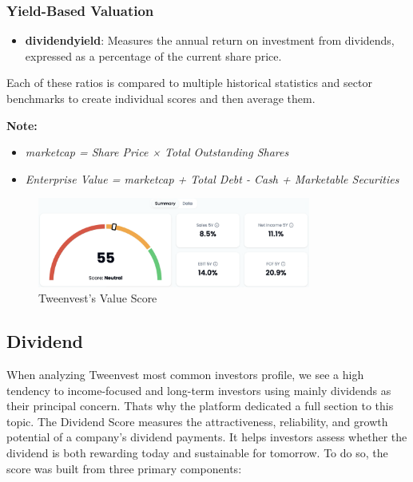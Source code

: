 \documentclass[11pt,english,a4paper,hidelinks]{book}
\begin{document}
\subsubsection{Yield-Based Valuation}
\begin{itemize}
    \item \textbf{\acrshort{dividendyield}}: Measures the annual return on investment from dividends, expressed as a percentage of the current share price.
\end{itemize}

\vspace{0.5cm}
\noindent Each of these ratios is compared to multiple historical statistics and sector benchmarks to create individual scores and then average them.

\vspace{0.5cm}
\noindent \textbf{Note:}
\begin{itemize}
    \item \textit{\acrshort{marketcap} = Share Price × Total Outstanding Shares}
    \item \textit{Enterprise Value = \acrshort{marketcap} + Total Debt - Cash + Marketable Securities}
\end{itemize}

\begin{figure}[H]
    \centering
    \includegraphics[width=0.8\textwidth]{images/tweenvest/value score.png}
    \caption{Tweenvest's Value Score}
    \label{fig:valuation_score}
\end{figure}


\subsection{Dividend}
\noindent When analyzing Tweenvest most common investors profile, we see a high tendency to income-focused and long-term investors using mainly dividends as their principal concern. Thats why the platform dedicated a full section to this topic. The Dividend Score measures the attractiveness, reliability, and growth potential of a company's dividend payments. It helps investors assess whether the dividend is both rewarding today and sustainable for tomorrow. To do so, the score was built from three primary components:
\end{document}
